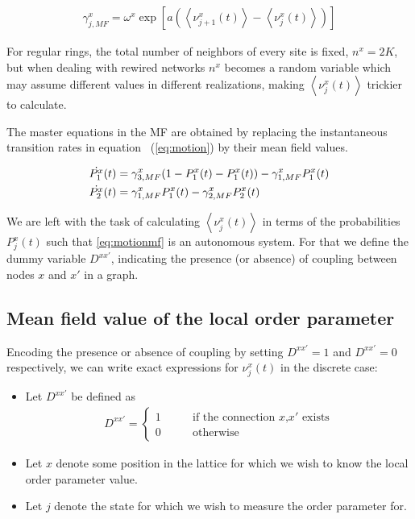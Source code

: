 \begin{align}
  \gamma^x_{j,MF} = \omega^x \exp \left[ a \left( \left< \nu^x_{j+1}(t) \right> - \left< \nu^x_j(t) \right> \right) \right]
  \label{gammaMF}
\end{align}

For regular rings, the total number of neighbors of every site is fixed, $n^x= 2K$, but when dealing with rewired networks $n^x$
becomes a random variable which may assume different values in different realizations, making $\left<\nu^x_j(t)\right>$ trickier to
calculate.

The master equations in the MF are obtained by replacing the instantaneous transition rates in equation~ (\ref{eq:motion}) by their
mean field values.

\begin{align}
  \dot{P_1^x}(t) &= \gamma^x_{3,MF} (1-P_1^x(t)-P_1^x(t)) - \gamma^x_{1,MF} P_1^x(t) \notag \\
  \dot{P_2^x}(t) &= \gamma^x_{1,MF}  P_1^x(t) - \gamma^x_{2,MF} P_2^x(t)
  \label{eq:motionmf}
\end{align}

We are left with the task of calculating $\left<\nu^x_j(t)\right>$ in terms of the probabilities $P^x_j(t)$ such that \ref{eq:motionmf}
is an autonomous system. For that we define the dummy variable $D^{xx'}$, indicating the presence (or absence) of coupling between
nodes $x$ and $x'$ in a graph.

\subsection{Mean field value of the local order parameter}

Encoding the presence or absence of coupling by setting $D^{xx'}=1$ and $D^{xx'}=0$ respectively, we can write exact expressions for
$\nu^x_j(t)$ in the discrete case:

\begin{itemize}
  \item Let $D^{xx'}$ be defined as
  \begin{align}
  D^{xx'} = 
    \begin{cases}
    1 \qquad &\text{if the connection $x$,$x'$ exists}\\
    0 \qquad &\text{otherwise}
    \end{cases}
  \end{align}
  \item Let $x$ denote some position in the lattice for which we wish to know the local order parameter value.
  \item Let $j$ denote the state for which we wish to measure the order parameter for.
\end{itemize}


